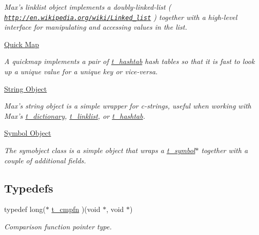 \begin{DoxyCompactItemize}
\begin{DoxyCompactList}\small\item\em Max's linklist object implements a doubly-\/linked-\/list ( \href{http://en.wikipedia.org/wiki/Linked_list}{\tt http://en.wikipedia.org/wiki/Linked\_\-list} ) together with a high-\/level interface for manipulating and accessing values in the list. \item\end{DoxyCompactList}\item 
\hyperlink{group__quickmap}{Quick Map}


\begin{DoxyCompactList}\small\item\em A quickmap implements a pair of \hyperlink{structt__hashtab}{t\_\-hashtab} hash tables so that it is fast to look up a unique value for a unique key or vice-\/versa. \item\end{DoxyCompactList}\item 
\hyperlink{group__string}{String Object}


\begin{DoxyCompactList}\small\item\em Max's string object is a simple wrapper for c-\/strings, useful when working with Max's \hyperlink{structt__dictionary}{t\_\-dictionary}, \hyperlink{structt__linklist}{t\_\-linklist}, or \hyperlink{structt__hashtab}{t\_\-hashtab}. \item\end{DoxyCompactList}\item 
\hyperlink{group__symobject}{Symbol Object}


\begin{DoxyCompactList}\small\item\em The symobject class is a simple object that wraps a \hyperlink{structt__symbol}{t\_\-symbol}$\ast$ together with a couple of additional fields. \item\end{DoxyCompactList}\end{DoxyCompactItemize}
\subsection*{Typedefs}
\begin{DoxyCompactItemize}
\item 
typedef long($\ast$ \hyperlink{group__datastore_gaaf4ae6dd800a2be9abd645cf70aeb38f}{t\_\-cmpfn} )(void $\ast$, void $\ast$)
\begin{DoxyCompactList}\small\item\em Comparison function pointer type. \item\end{DoxyCompactList}\end{DoxyCompactItemize}
